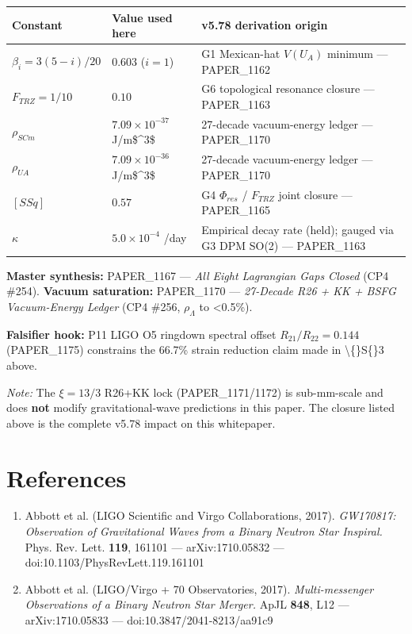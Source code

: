 \documentclass[11pt]{article}
\begin{document}
\begin{center}
\begin{longtable}{lll}
\toprule
Constant & Value used here & v5.78 derivation origin \tabularnewline
\midrule
\endhead
$\beta_i = 3(5-i)/20$ & $0.603$ ($i=1$) & G1 Mexican-hat $V(U_A)$ minimum --- PAPER\_1162 \tabularnewline
$F_{TRZ} = 1/10$ & $0.10$ & G6 topological resonance closure --- PAPER\_1163 \tabularnewline
$\rho_{SCm}$ & $7.09\times10^{-37}$ J/m\$\textasciicircum{}3\$ & 27-decade vacuum-energy ledger --- PAPER\_1170 \tabularnewline
$\rho_{UA}$ & $7.09\times10^{-36}$ J/m\$\textasciicircum{}3\$ & 27-decade vacuum-energy ledger --- PAPER\_1170 \tabularnewline
$[SSq]$ & $0.57$ & G4 $\Phi_{res}$ / $F_{TRZ}$ joint closure --- PAPER\_1165 \tabularnewline
$\kappa$ & $5.0\times10^{-4}$ /day & Empirical decay rate (held); gauged via G3 DPM SO(2) --- PAPER\_1163 \tabularnewline
\bottomrule
\end{longtable}
\end{center}

\textbf{Master synthesis:} PAPER\_1167 --- \emph{All Eight Lagrangian Gaps Closed} (CP4 \#254). \textbf{Vacuum saturation:} PAPER\_1170 --- \emph{27-Decade R26 + KK + BSFG Vacuum-Energy Ledger} (CP4 \#256, $\rho_\Lambda$ to <0.5\%).

\textbf{Falsifier hook:} P11 LIGO O5 ringdown spectral offset $R_{21}/R_{22}=0.144$ (PAPER\_1175) constrains the 66.7\% strain reduction claim made in \textbackslash\{\}S\{\}3 above.

\emph{Note:} The $\xi=13/3$ R26+KK lock (PAPER\_1171/1172) is sub-mm-scale and does \textbf{not} modify gravitational-wave predictions in this paper. The closure listed above is the complete v5.78 impact on this whitepaper.

\section*{References}

\begin{enumerate}
  \item Abbott et al. (LIGO Scientific and Virgo Collaborations, 2017). \emph{GW170817: Observation of Gravitational Waves from a Binary Neutron Star Inspiral.} Phys. Rev. Lett. \textbf{119}, 161101 --- arXiv:1710.05832 --- doi:10.1103/PhysRevLett.119.161101
  \item Abbott et al. (LIGO/Virgo + 70 Observatories, 2017). \emph{Multi-messenger Observations of a Binary Neutron Star Merger.} ApJL \textbf{848}, L12 --- arXiv:1710.05833 --- doi:10.3847/2041-8213/aa91c9
\end{enumerate}
\end{document}
